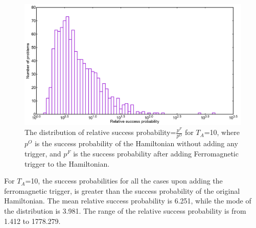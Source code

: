 \documentclass[12]{article}
\begin{document}
\begin{figure}[H]
\centering 
\includegraphics[scale=0.3]{Hist_s12_T10_g1.png}
\caption{The distribution of relative success probability=$\frac{p^F}{p^O}$ for $T_A$=10, where $p^O$ is the success probability of the Hamiltonian without adding any trigger, and $p^F$ is the success probability after adding Ferromagnetic trigger to the Hamiltonian.}
\label{fig:f4}
\end{figure}
For $T_A$=10, the success probabilities for all the cases upon adding the ferromagnetic trigger, is greater than the success probability of the original Hamiltonian. The mean relative success probability is 6.251, while the mode of the distribution is 3.981. The range of the relative success probability is from 1.412 to 1778.279. 
\end{document}
